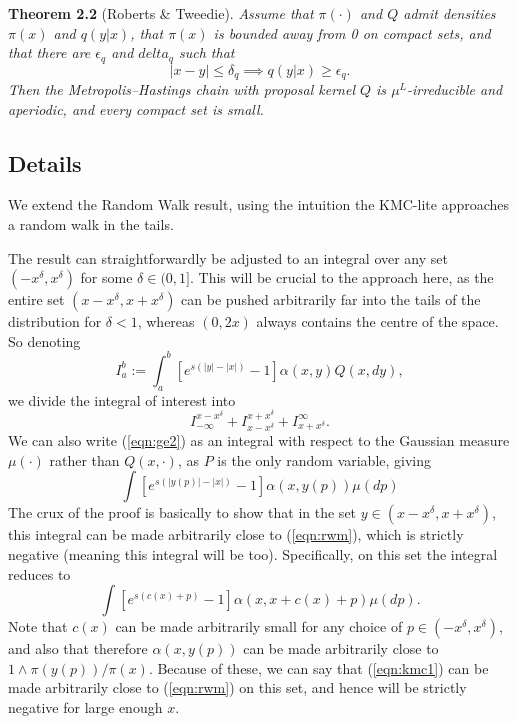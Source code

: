 \documentclass{article}
\begin{document}
\textbf{Theorem 2.2} (Roberts \& Tweedie).  {\itshape Assume that $\pi(\cdot)$ and $Q$ admit densities $\pi(x)$ and $q(y|x)$, that $\pi(x)$ is bounded away from 0 on compact sets, and that there are $\epsilon_q$ and $delta_q$ such that
\[
|x - y| \leq \delta_q \implies q(y|x) \geq \epsilon_q.
\]
Then the Metropolis--Hastings chain with proposal kernel $Q$ is $\mu^L$-irreducible and aperiodic, and every compact set is small.}

\subsection{Details}

We extend the Random Walk result, using the intuition the KMC-lite approaches a random walk in the tails.

The result can straightforwardly be adjusted to an integral over any set $(-x^\delta,x^{\delta})$ for some $\delta \in (0,1]$.  This will be crucial to the approach here, as the entire set $(x - x^\delta,x + x^\delta)$ can be pushed arbitrarily far into the tails of the distribution for $\delta < 1$, whereas $(0,2x)$ always contains the centre of the space.  So denoting
\[
I_a^b := \int_a^b \left[ e^{s(|y| - |x|)} - 1 \right]\alpha(x,y)Q(x,dy),
\]
we divide the integral of interest into
\[
I_{-\infty}^{x - x^\delta} + I_{x - x^\delta}^{x + x^\delta} + I_{x+x^\delta}^\infty.
\]
We can also write (\ref{eqn:ge2}) as an integral with respect to the Gaussian measure $\mu(\cdot)$ rather than $Q(x,\cdot)$, as $P$ is the only random variable, giving
\[
\int \left[ e^{s(|y(p)| - |x|)} - 1 \right] \alpha(x,y(p)) \mu(dp)
\]
The crux of the proof is basically to show that in the set $y \in (x - x^\delta,x+ x^{\delta})$, this integral can be made arbitrarily close to (\ref{eqn:rwm}), which is strictly negative (meaning this integral will be too).  Specifically, on this set the integral reduces to
\begin{equation} \label{eqn:kmc1}
\int \left[ e^{s(c(x) + p)} - 1 \right] \alpha(x,x + c(x) + p) \mu(dp).
\end{equation}
Note that $c(x)$ can be made arbitrarily small for any choice of $p \in (-x^\delta,x^\delta)$, and also that therefore $\alpha(x,y(p))$ can be made arbitrarily close to $1 \wedge \pi(y(p))/\pi(x)$.  Because of these, we can say that (\ref{eqn:kmc1}) can be made arbitrarily close to (\ref{eqn:rwm}) on this set, and hence will be strictly negative for large enough $x$.
\end{document}
